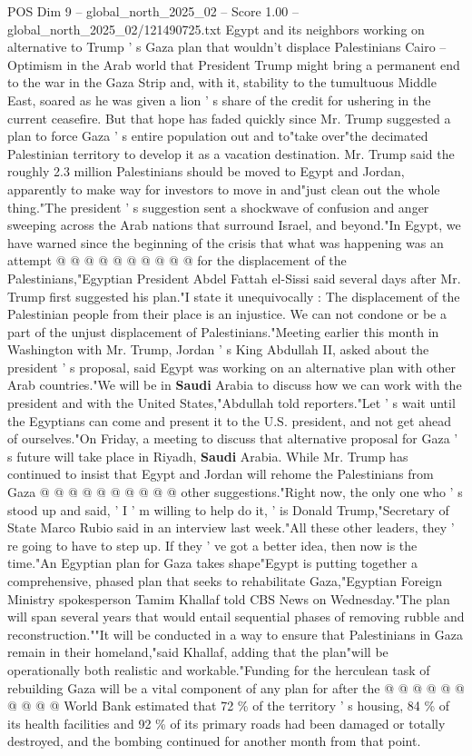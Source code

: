 \begin{textsample}{POS Dim 9 – global\_north\_2025\_02 – Score 1.00 – global\_north\_2025\_02/121490725.txt}  \label{ex:f9_pos_394}
Egypt and its neighbors working on alternative to Trump ' s Gaza plan that wouldn't displace Palestinians Cairo -- Optimism in the Arab world that President Trump might bring a permanent end to the war in the Gaza Strip and, with it, stability to the tumultuous Middle East, soared as he was given a lion ' s share of the credit for ushering in the current ceasefire.
But that hope has faded quickly since Mr.
Trump suggested a plan to force Gaza ' s entire population out and to"take over"the decimated Palestinian territory to develop it as a vacation destination.
Mr.
Trump said the roughly 2.3 million Palestinians should be moved to Egypt and Jordan, apparently to make way for investors to move in and"just clean out the whole thing."The president ' s suggestion sent a shockwave of confusion and anger sweeping across the Arab nations that surround Israel, and beyond."In Egypt, we have warned since the beginning of the crisis that what was happening was an attempt @ @ @ @ @ @ @ @ @ @ for the displacement of the Palestinians,"Egyptian President Abdel Fattah el-Sissi said several days after Mr.
Trump first suggested his plan."I state it unequivocally : The displacement of the Palestinian people from their place is an injustice.
We can not condone or be a part of the unjust displacement of Palestinians."Meeting earlier this month in Washington with Mr.
Trump, Jordan ' s King Abdullah II, asked about the president ' s proposal, said Egypt was working on an alternative plan with other Arab countries."We will be in \textbf{Saudi} Arabia to discuss how we can work with the president and with the United States,"Abdullah told reporters."Let ' s wait until the Egyptians can come and present it to the U.S. president, and not get ahead of ourselves."On Friday, a meeting to discuss that alternative proposal for Gaza ' s future will take place in Riyadh, \textbf{Saudi} Arabia.
While Mr.
Trump has continued to insist that Egypt and Jordan will rehome the Palestinians from Gaza @ @ @ @ @ @ @ @ @ @ other suggestions."Right now, the only one who ' s stood up and said, ' I ' m willing to help do it, ' is Donald Trump,"Secretary of State Marco Rubio said in an interview last week."All these other leaders, they ' re going to have to step up.
If they ' ve got a better idea, then now is the time."An Egyptian plan for Gaza takes shape"Egypt is putting together a comprehensive, phased plan that seeks to rehabilitate Gaza,"Egyptian Foreign Ministry spokesperson Tamim Khallaf told CBS News on Wednesday."The plan will span several years that would entail sequential phases of removing rubble and reconstruction.""It will be conducted in a way to ensure that Palestinians in Gaza remain in their homeland,"said Khallaf, adding that the plan"will be operationally both realistic and workable."Funding for the herculean task of rebuilding Gaza will be a vital component of any plan for after the @ @ @ @ @ @ @ @ @ @ World Bank estimated that 72 \% of the territory ' s housing, 84 \% of its health facilities and 92 \% of its primary roads had been damaged or totally destroyed, and the bombing continued for another month from that point.

\end{textsample}
